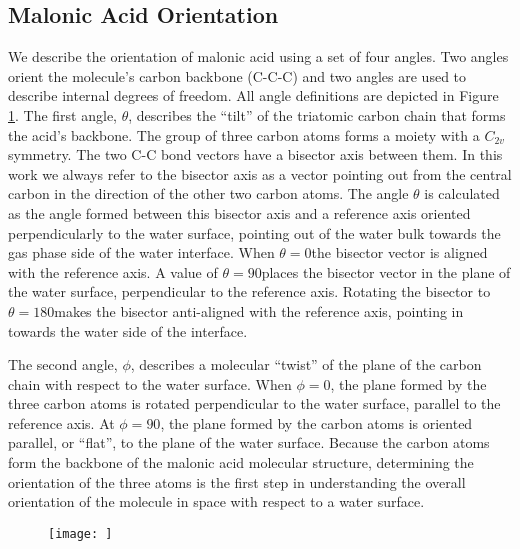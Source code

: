 \subsection{Malonic Acid Orientation}

We describe the orientation of malonic acid using a set of four angles. Two angles orient the molecule's carbon backbone (C-C-C) and two angles are used to describe internal degrees of freedom. All angle definitions are depicted in Figure \ref{fig:angle-definitions}. The first angle, $\theta$, describes the ``tilt'' of the triatomic carbon chain that forms the acid's backbone. The group of three carbon atoms forms a moiety with a $C_{2v}$ symmetry. The two C-C bond vectors have a bisector axis between them. In this work we always refer to the bisector axis as a vector pointing out from the central carbon in the direction of the other two carbon atoms. The angle $\theta$ is calculated as the angle formed between this bisector axis and a reference axis oriented perpendicularly to the water surface, pointing out of the water bulk towards the gas phase side of the water interface. When $\theta = 0$\textdegree the bisector vector is aligned with the reference axis. A value of $\theta=90$\textdegree places the bisector vector in the plane of the water surface, perpendicular to the reference axis. Rotating the bisector to $\theta=180$\textdegree makes the bisector anti-aligned with the reference axis, pointing in towards the water side of the interface.

The second angle, $\phi$, describes a molecular ``twist'' of the plane of the carbon chain with respect to the water surface. When $\phi=0$\textdegree, the plane formed by the three carbon atoms is rotated perpendicular to the water surface, parallel to the reference axis. At $\phi=90$\textdegree, the plane formed by the carbon atoms is oriented parallel, or ``flat'', to the plane of the water surface. Because the carbon atoms form the backbone of the malonic acid molecular structure, determining the orientation of the three atoms is the first step in understanding the overall orientation of the molecule in space with respect to a water surface.

\begin{figure}[h!]
	\begin{center}
		\texttt{[image: ]}
		\caption{}
		\label{fig:angle-definitions}
	\end{center}
\end{figure}

